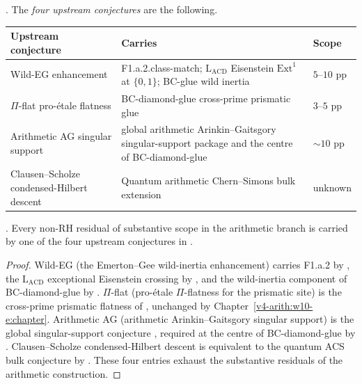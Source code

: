 \begin{definition}
\label{v4-arith:w10-final:def:upstream-ledger}
\ClaimStatusDefinitional. The \emph{four upstream conjectures} are
the following.
\begin{center}
\small
\begin{tabular}{p{3.4cm}p{7.2cm}p{2.0cm}}
\toprule
\textbf{Upstream conjecture} & \textbf{Carries} & \textbf{Scope}\\
\midrule
Wild-EG enhancement &
F1.a.2.class-match;
\(\mathrm{L}_{\mathrm{ACD}}\) Eisenstein \(\mathrm{Ext}^{1}\) at
\(\{0,1\}\); BC-glue wild inertia &
\(5\)--\(10\) pp\\
\(\Pi\)-flat pro-\'etale flatness &
BC-diamond-glue cross-prime prismatic glue &
\(3\)--\(5\) pp\\
Arithmetic AG singular support &
global arithmetic Arinkin--Gaitsgory singular-support package and
the centre of BC-diamond-glue &
\(\sim 10\) pp\\
Clausen--Scholze condensed-Hilbert descent &
Quantum arithmetic Chern--Simons bulk extension &
unknown\\
\bottomrule
\end{tabular}
\end{center}
\end{definition}

\begin{theorem}
\label{v4-arith:w10-final:thm:four-upstream}
\ClaimStatusProvedHere. Every non-RH residual of substantive scope
in the arithmetic branch is carried by one of the four upstream
conjectures in .
\end{theorem}

\begin{proof}
Wild-EG (the Emerton--Gee wild-inertia enhancement) carries F1.a.2 by
, the
\(\mathrm{L}_{\mathrm{ACD}}\) exceptional Eisenstein crossing by
, and the wild-inertia
component of BC-diamond-glue by
.
\(\Pi\)-flat (pro-\'etale \(\Pi\)-flatness for the prismatic site) is
the cross-prime prismatic flatness of
, unchanged by
Chapter~\ref{v4-arith:w10-e:chapter}. Arithmetic AG (arithmetic
Arinkin--Gaitsgory singular support) is the global singular-support
conjecture , required at the centre
of BC-diamond-glue by .
Clausen--Scholze condensed-Hilbert descent is equivalent to the quantum
ACS bulk conjecture by .
These four entries exhaust the substantive residuals of the arithmetic
construction.
\end{proof}

